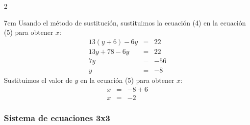 {\begin{multicols}{2}
\begin{parts}
                \setcounter{equation}{0}

                \begin{solutionbox}{7cm}
                    Usando el método de sustitución, sustituimos la ecuación (4) en la ecuación (5) para obtener $x$:
                    \begin{eqnarray}
                        13(y+6)-6y & = & 22 \nonumber\\
                        13y+78-6y & = & 22 \nonumber\\
                        7y & = & -56 \nonumber\\
                        y & = & -8 \nonumber
                    \end{eqnarray}
                    Sustituimos el valor de $y$ en la ecuación (5) para obtener $x$:
                    \begin{eqnarray}
                        x & = & -8+6 \nonumber\\
                        x & = & -2 \nonumber
                    \end{eqnarray}
                \end{solutionbox}
            \end{parts}
        \end{multicols}
    }
 
    \subsubsection{Sistema de ecuaciones 3x3}

